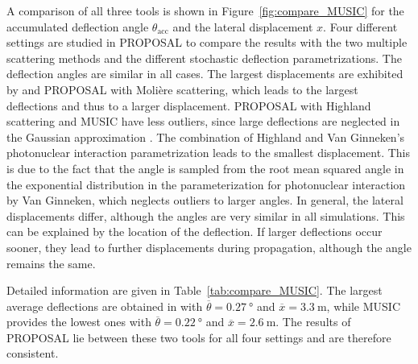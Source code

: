 A comparison of all three tools is shown in Figure~\ref{fig:compare_MUSIC} 
for the 
accumulated deflection angle $\theta_{\text{acc}}$ and the lateral displacement
$x$. Four different settings are studied in PROPOSAL to compare the results with 
the two multiple scattering methods and the different stochastic deflection parametrizations.
The deflection angles are 
similar in all cases. The 
largest displacements are exhibited by  and PROPOSAL with Molière scattering, which 
leads to the largest deflections and thus to a larger displacement. 
PROPOSAL with Highland scattering and MUSIC have less outliers, since large 
deflections are neglected in the Gaussian approximation \cite{HIGHLAND_1975}. 
The combination of Highland and 
Van Ginneken's photonuclear interaction parametrization leads to the smallest 
displacement. This is due to the fact that the angle is sampled from the root mean squared angle in the exponential distribution
in the parameterization for photonuclear interaction by Van Ginneken, which neglects 
outliers to larger angles. 
In general, the lateral displacements differ, although the angles are very similar in all simulations. 
This can be explained by the location of the deflection. If larger deflections occur sooner, 
they lead to further displacements during propagation, although the angle remains the same.

Detailed information are given in Table~\ref{tab:compare_MUSIC}. 
The largest average deflections are obtained in  with 
$\overline{\theta} = \SI{0.27}{\degree}$ 
and $\overline{x} = \SI{3.3}{\meter}$, while MUSIC provides the lowest 
ones with $\overline{\theta} = \SI{0.22}{\degree}$ and 
$\overline{x} = \SI{2.6}{\meter}$.
The results of PROPOSAL lie between 
these two tools for all four settings and are therefore consistent. 

